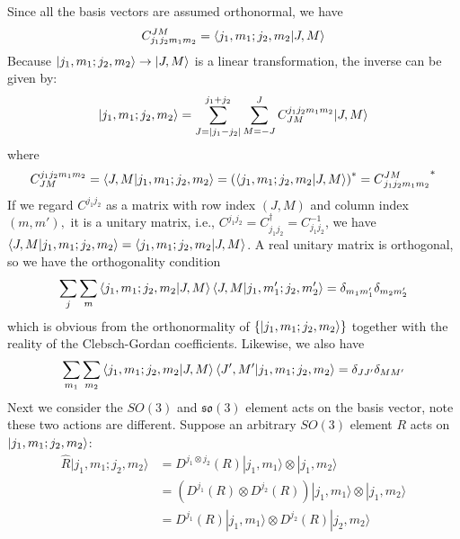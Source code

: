 \documentclass{article}
\begin{document}
	Since all the basis vectors are assumed orthonormal, we have
	\begin{equation*}
		C_{j_{1} j_{2} m_{1} m_{2}}^{JM} =\bra{j_{1} ,m_{1} ;j_{2} ,m_{2}}\ket{J,M}
	\end{equation*}
	Because $| j_{1} ,m_{1} ;j_{2} ,m_{2}\rangle \rightarrow \ket{J,M}$ is a linear transformation, the inverse can be given by:
	\begin{equation*}
		\ket{j_{1} ,m_{1} ;j_{2} ,m_{2}} =\sum _{J=| j_{1} -j_{2}| }^{j_{1} +j_{2}}\sum _{M=-J}^{J} C_{JM}^{j_{1} j_{2} m_{1} m_{2}} |J,M\rangle  
	\end{equation*}
	where
	\begin{equation*}
		C_{JM}^{j_{1} j_{2} m_{1} m_{2}} =\bra{J,M}\ket{j_{1} ,m_{1} ;j_{2} ,m_{2}} =\left(\bra{j_{1} ,m_{1} ;j_{2} ,m_{2}}\ket{J,M}\right)^{*} =C{_{j_{1} j_{2} m_{1} m_{2}}^{JM}}^{*}
	\end{equation*}
	If we regard $C^{j_{1} j_{2}}$ as a matrix with row index $(J,M)$ and column index $( m,m') ,$ it is a unitary matrix, i.e., $C^{j_{1} j_{2}} =C_{j_{1} j_{2}}^{\dagger } =C_{j_{1} j_{2}}^{-1}$, we have $\bra{J,M}\ket{j_{1} ,m_{1} ;j_{2} ,m_{2}} =\bra{j_{1} ,m_{1} ;j_{2} ,m_{2}}\ket{J,M}$. A real unitary matrix is orthogonal, so we have the orthogonality condition
	\begin{equation*}
		\sum _{j}\sum _{m}\bra{j_{1} ,m_{1} ;j_{2} ,m_{2}}\ket{J,M}\bra{J,M}\ket{j_{1} ,m'_{1} ;j_{2} ,m'_{2}} =\delta _{m_{1} m'_{1}} \delta _{m_{2} m'_{2}}
	\end{equation*}
	which is obvious from the orthonormality of $\left\{\ket{j_{1} ,m_{1} ;j_{2} ,m_{2}}\right\}$ together with the reality of the Clebsch-Gordan coefficients. Likewise, we also have
	\begin{equation*}
		\sum _{m_{1}}\sum _{m_{2}}\bra{j_{1} ,m_{1} ;j_{2} ,m_{2}}\ket{J,M}\bra{J',M'}\ket{j_{1} ,m_{1} ;j_{2} ,m_{2}} =\delta _{JJ'} \delta _{MM'}
	\end{equation*}
	Next we consider the $SO( 3)$ and $\mathfrak{so}( 3)$ element acts on the basis vector, note these two actions are different. Suppose an arbitrary $SO( 3)$ element $R$ acts on $\ket{j_{1} ,m_{1} ;j_{2} ,m_{2}}$:
	\begin{equation*}
		\begin{aligned}
			\hat{R}| j_{1} ,m_{1} ;j_{2} ,m_{2}\rangle  & =D^{j_{1} \otimes j_{2}} (R)| j_{1} ,m_{1}\rangle  \otimes | j_{1} ,m_{2}\rangle  \\
			& =\left( D^{j_{1}} (R)\otimes D^{j_{2}} (R)\right)| j_{1} ,m_{1}\rangle  \otimes | j_{1} ,m_{2}\rangle  \\
			& =D^{j_{1}} (R)| j_{1} ,m_{1}\rangle  \otimes D^{j_{2}} (R)| j_{2} ,m_{2}\rangle  
		\end{aligned}
	\end{equation*}
\end{document}

